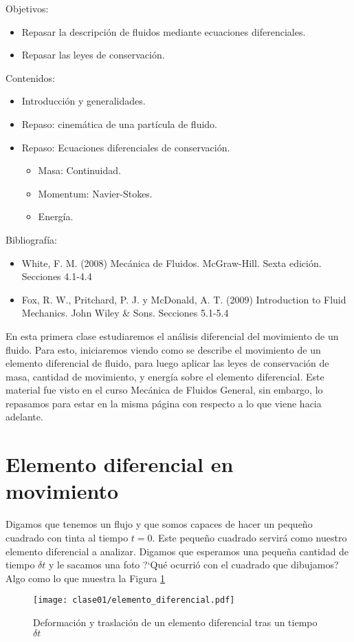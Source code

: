 \begin{framed}

Objetivos:
\begin{itemize}
    \item Repasar la descripción de fluidos mediante ecuaciones diferenciales.
    \item Repasar las leyes de conservación.
\end{itemize}

Contenidos:
\begin{itemize}
    \item Introducción y generalidades.
    \item Repaso: cinemática de una partícula de fluido.
    \item Repaso: Ecuaciones diferenciales de conservación. 
    \begin{itemize}
        \item Masa: Continuidad.
        \item Momentum: Navier-Stokes.
        \item Energía.
    \end{itemize}
\end{itemize}

Bibliografía:
\begin{itemize}
    \item White, F. M. (2008) Mecánica de Fluidos. McGraw-Hill. Sexta edición. Secciones 4.1-4.4
    \item Fox, R. W., Pritchard, P. J. y McDonald, A. T. (2009) Introduction to Fluid Mechanics. John Wiley \& Sons. Secciones 5.1-5.4
\end{itemize}
\end{framed}

En esta primera clase estudiaremos el análisis diferencial del movimiento de un fluido. 
Para esto, iniciaremos viendo como se describe el movimiento de un elemento diferencial de fluido, para luego aplicar las leyes de conservación de masa, cantidad de movimiento, y energía sobre el elemento diferencial.
 Este material fue visto en el curso Mecánica de Fluidos General, sin embargo, lo repasamos para estar en la misma página con respecto a lo que viene hacia adelante.

\section*{Elemento diferencial en movimiento}
Digamos que tenemos un flujo y que somos capaces de hacer un pequeño cuadrado con tinta al tiempo $t=0$.
Este pequeño cuadrado servirá como nuestro elemento diferencial a analizar.
Digamos que esperamos una pequeña cantidad de tiempo $\delta t$ y le sacamos una foto \mbox{?`}Qué ocurrió con el cuadrado que dibujamos? Algo como lo que muestra la Figura \ref{fig:elemento_diferencial}
%
\begin{figure}[h!]
\centering
\texttt{[image: clase01/elemento\_diferencial.pdf]}
\caption{Deformación y traslación de un elemento diferencial tras un tiempo $\delta t$}
\label{fig:elemento_diferencial}
\end{figure}

